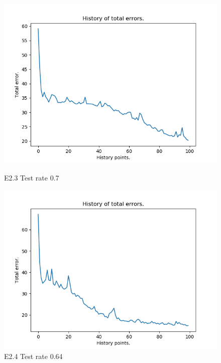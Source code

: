 \documentclass{classrep}
\begin{document}
\begin{figure}[H]
\begin{minipage}{0.5\linewidth}
				\centering
				\includegraphics[scale=0.25]{iris_nn_l6.png}
				\caption{E2.3 Test rate  0.7}
			\end{minipage}
			\begin{minipage}{0.5\linewidth}
				\centering
				\includegraphics[scale=0.25]{iris_nn_l8.png}
				\caption{E2.4 Test rate  0.64}
			\end{minipage}
		\end{figure}
		\FloatBarrier
\end{document}
